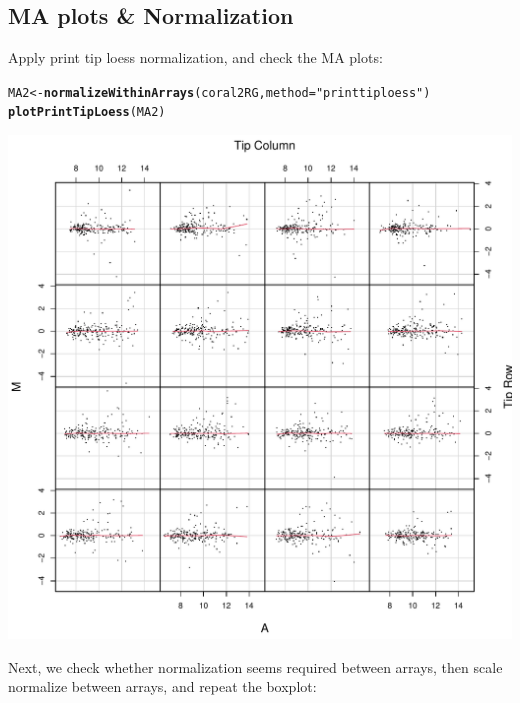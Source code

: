 \documentclass[a4paper,9pt]{article}\usepackage[]{graphicx}\usepackage[]{color}
\makeatletter
\def\maxwidth{ %
  \ifdim\Gin@nat@width>\linewidth
    \linewidth
  \else
    \Gin@nat@width
  \fi
}
\newcommand{\hlstr}[1]{\textcolor[rgb]{0.192,0.494,0.8}{#1}}%
\newcommand{\hlstd}[1]{\textcolor[rgb]{0.345,0.345,0.345}{#1}}%
\newcommand{\hlkwb}[1]{\textcolor[rgb]{0.69,0.353,0.396}{#1}}%
\newcommand{\hlkwc}[1]{\textcolor[rgb]{0.333,0.667,0.333}{#1}}%
\newcommand{\hlkwd}[1]{\textcolor[rgb]{0.737,0.353,0.396}{\textbf{#1}}}%
\newenvironment{kframe}{%
 \def\at@end@of@kframe{}%
 \ifinner\ifhmode%
  \def\at@end@of@kframe{\end{minipage}}%
  \begin{minipage}{\columnwidth}%
 \fi\fi%
 \def\FrameCommand##1{\hskip\@totalleftmargin \hskip-\fboxsep
 \colorbox{shadecolor}{##1}\hskip-\fboxsep
     \hskip-\linewidth \hskip-\@totalleftmargin \hskip\columnwidth}%
 \MakeFramed {\advance\hsize-\width
   \@totalleftmargin\z@ \linewidth\hsize
   \@setminipage}}%
 {\par\unskip\endMakeFramed%
 \at@end@of@kframe}
\newenvironment{knitrout}{}{} %
\makeatother
\begin{document}
\subsection{MA plots \& Normalization}
Apply print tip loess normalization, and check the MA plots:
\begin{knitrout}
\color{fgcolor}\begin{kframe}
\begin{alltt}
\hlstd{MA2} \hlkwb{<-} \hlkwd{normalizeWithinArrays}\hlstd{(coral2RG,} \hlkwc{method} \hlstd{=} \hlstr{"printtiploess"}\hlstd{)}
\hlkwd{plotPrintTipLoess}\hlstd{(MA2)}
\end{alltt}
\end{kframe}
\includegraphics[width=\maxwidth]{figure/unnamed-chunk-21-1} 

\end{knitrout}
Next, we check whether normalization seems required between arrays,
then scale normalize between arrays, and repeat the boxplot:
\end{document}
